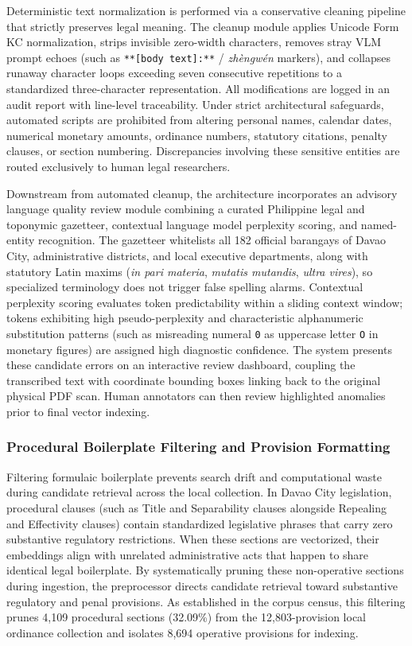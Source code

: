         Deterministic text normalization is performed via a conservative cleaning pipeline that strictly preserves legal meaning. The cleanup module applies Unicode Form KC normalization, strips invisible zero-width characters, removes stray VLM prompt echoes (such as \texttt{**[body text]:**} / \textit{zh\`engw\'en} markers), and collapses runaway character loops exceeding seven consecutive repetitions to a standardized three-character representation. All modifications are logged in an audit report with line-level traceability. Under strict architectural safeguards, automated scripts are prohibited from altering personal names, calendar dates, numerical monetary amounts, ordinance numbers, statutory citations, penalty clauses, or section numbering. Discrepancies involving these sensitive entities are routed exclusively to human legal researchers.

        Downstream from automated cleanup, the architecture incorporates an advisory language quality review module combining a curated Philippine legal and toponymic gazetteer, contextual language model perplexity scoring, and named-entity recognition. The gazetteer whitelists all 182 official barangays of Davao City, administrative districts, and local executive departments, along with statutory Latin maxims (\textit{in pari materia}, \textit{mutatis mutandis}, \textit{ultra vires}), so specialized terminology does not trigger false spelling alarms. Contextual perplexity scoring evaluates token predictability within a sliding context window; tokens exhibiting high pseudo-perplexity and characteristic alphanumeric substitution patterns (such as misreading numeral \texttt{0} as uppercase letter \texttt{O} in monetary figures) are assigned high diagnostic confidence. The system presents these candidate errors on an interactive review dashboard, coupling the transcribed text with coordinate bounding boxes linking back to the original physical PDF scan. Human annotators can then review highlighted anomalies prior to final vector indexing.

        \subsubsection{Procedural Boilerplate Filtering and Provision Formatting}
        \label{sec:local_boilerplate_filtering}
        Filtering formulaic boilerplate prevents search drift and computational waste during candidate retrieval across the local collection. In Davao City legislation, procedural clauses (such as Title and Separability clauses alongside Repealing and Effectivity clauses) contain standardized legislative phrases that carry zero substantive regulatory restrictions. When these sections are vectorized, their embeddings align with unrelated administrative acts that happen to share identical legal boilerplate. By systematically pruning these non-operative sections during ingestion, the preprocessor directs candidate retrieval toward substantive regulatory and penal provisions. As established in the corpus census, this filtering prunes 4,109 procedural sections (32.09\%) from the 12,803-provision local ordinance collection and isolates 8,694 operative provisions for indexing.

